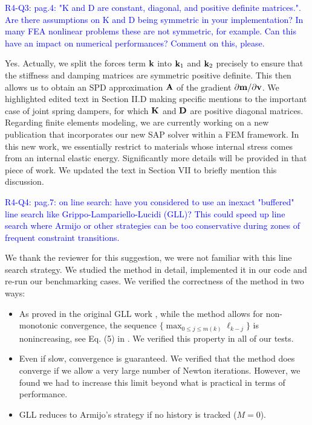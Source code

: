 \vspace{5mm}

\textcolor{blue}{R4-Q3: pag.4: "K and D are constant, diagonal, and positive
definite matrices.". Are there assumptions on K and D being symmetric in your
implementation? In many FEA nonlinear problems these are not symmetric, for
example. Can this have an impact on numerical performances? Comment on this,
please.}

Yes. Actually, we split the forces term ${\mathbf{k}}$ into ${\mathbf{k}}_1$ and ${\mathbf{k}}_2$
precisely to ensure that the stiffness and damping matrices are symmetric
positive definite. This then allows us to obtain an SPD approximation ${\mathbf{A}}$ of
the gradient $\partial {\mathbf{m}}/\partial {\mathbf{v}}$. We highlighted edited text in
Section II.D making specific mentions to the important case of joint spring
dampers, for which ${\mathbf{K}}$ and ${\mathbf{D}}$ are positive diagonal matrices.
Regarding finite elements modeling, we are currently working on a new
publication that incorporates our new SAP solver within a FEM framework. In this
new work, we essentially restrict to materials whose internal stress comes from
an internal elastic energy. Significantly more details will be provided in that
piece of work. We updated the text in Section VII to briefly mention this
discussion.

\vspace{5mm}

\textcolor{blue}{R4-Q4: pag.7: on line search: have you considered to use an
inexact "buffered" line search like Grippo-Lampariello-Lucidi (GLL)? This could
speed up line search where Armijo or other strategies can be too conservative
during zones of frequent constraint transitions.}

We thank the reviewer for this suggestion, we were not familiar with this line
search strategy. We studied the method in detail, implemented it in
our code and re-run our benchmarking cases. We verified the correctness of the
method in two ways:
\begin{itemize}
    \item As proved in the original GLL work \cite{bib:grippo1986nonmonotone},
    while the method allows for non-monotonic convergence, the sequence
    $\{\max_{0\leq j \leq m(k)}\ell_{k-j}\}$ is nonincreasing, see Eq. (5) in
    \cite{bib:grippo1986nonmonotone}. We verified this property in all of our
    tests.
    \item Even if slow, convergence is guaranteed. We verified that the method
    does converge if we allow a very large number of Newton iterations. However,
    we found we had to increase this limit beyond what is practical in terms of
    performance.
    \item GLL reduces to Armijo's strategy if no history is tracked ($M=0$).
\end{itemize}

